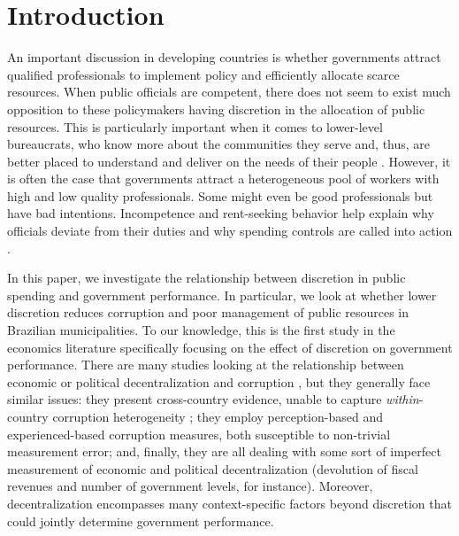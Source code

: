 \documentclass[11pt]{article}
\begin{document}
\section{Introduction} \label{sec:introduction}

An important discussion in developing countries is whether governments attract qualified professionals to implement policy and efficiently allocate scarce resources. When public officials are competent, there does not seem to exist much opposition to these policymakers having discretion in the allocation of public resources. This is particularly important when it comes to lower-level bureaucrats, who know more about the communities they serve and, thus, are better placed to understand and deliver on the needs of their people \citep{LipskyStreetLevelBureaucracy30th2010}. However, it is often the case that governments attract a heterogeneous pool of workers with high and low quality professionals. Some might even be good professionals but have bad intentions. Incompetence and rent-seeking behavior help explain why officials deviate from their duties and why spending controls are called into action \citep{LambsdorffCorruptionRentSeeking2002,OlkenCorruptionCostsRedistribution2006}.

In this paper, we investigate the relationship between discretion in public spending and government performance. In particular, we look at whether lower discretion reduces corruption and poor management of public resources in Brazilian municipalities. To our knowledge, this is the first study in the economics literature specifically focusing on the effect of discretion on government performance. There are many studies looking at the relationship between economic or political decentralization and corruption \citep{Treismancausescorruptioncrossnational2000,FismanDecentralizationcorruptionevidence2002,FanPoliticaldecentralizationcorruption2009,ChoudhuryGovernmentaldecentralizationcorruption2015}, but they generally face similar issues: they present cross-country evidence, unable to capture \emph{within}-country corruption heterogeneity \citep{Treismancausescorruptioncrossnational2000,FismanDecentralizationcorruptionevidence2002}; they employ perception-based \citep{Treismancausescorruptioncrossnational2000,FismanDecentralizationcorruptionevidence2002} and experienced-based \citep{FanPoliticaldecentralizationcorruption2009,ChoudhuryGovernmentaldecentralizationcorruption2015} corruption measures,  both susceptible to non-trivial measurement error; and, finally, they are all dealing with some sort of imperfect measurement of economic and political decentralization (devolution of fiscal revenues and number of government levels, for instance). Moreover, decentralization encompasses many context-specific factors beyond discretion that could jointly determine government performance.
\end{document}
